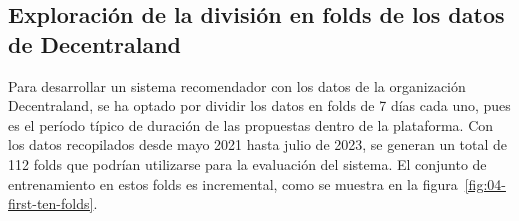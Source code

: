 \subsection{Exploración de la división en folds de los datos de Decentraland}
\label{subsec:exploracion-folds}


Para desarrollar un sistema recomendador con los datos de la organización Decentraland, se ha optado por dividir los datos en folds de 7 días cada uno, pues es el período típico de duración de las propuestas dentro de la plataforma. Con los datos recopilados desde mayo 2021 hasta julio de 2023, se generan un total de 112 folds que podrían utilizarse para la evaluación del sistema. El conjunto de entrenamiento en estos folds es incremental, como se muestra en la figura~\ref{fig:04-first-ten-folds}.

